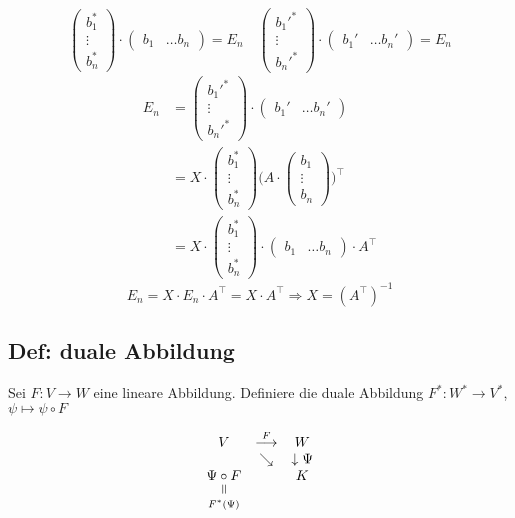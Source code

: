 \documentclass[titlepage,12pt,a4paper,ngerman]{report}
\newcommand{\verteq}{\rotatebox{90}{$\,=$}}
\newcommand{\equalto}[2]{\underset{\scriptstyle\overset{\mkern4mu\verteq}{#2}}{#1}}
\begin{document}
{$$\begin{pmatrix}
b_1^*\\
\vdots\\
b_n^*
\end{pmatrix} \cdot \begin{pmatrix}
b_1 & \dots b_n
\end{pmatrix} = E_n \quad \begin{pmatrix}
b_1'^*\\
\vdots\\
b_n'^*
\end{pmatrix} \cdot \begin{pmatrix}
b_1' & \dots b_n'
\end{pmatrix} = E_n $$
\begin{align*}
E_n &= \begin{pmatrix}
b_1'^*\\
\vdots\\
b_n'^*
\end{pmatrix} \cdot \begin{pmatrix}
b_1' & \dots b_n'
\end{pmatrix}\\
&= X \cdot \begin{pmatrix}
b_1^*\\
\vdots\\
b_n^*
\end{pmatrix} \bigg( A \cdot \begin{pmatrix}
b_1\\
\vdots\\
b_n
\end{pmatrix} \bigg) ^\top\\
&= X \cdot \begin{pmatrix}
b_1^*\\
\vdots\\
b_n^*
\end{pmatrix} \cdot \begin{pmatrix}
b_1 & \dots b_n
\end{pmatrix} \cdot A^\top
\end{align*}
$$E_n = X \cdot E_n \cdot A^\top = X \cdot A^\top \Rightarrow X = (A^\top)^{-1}$$
}

\subsection{Def: duale Abbildung}
Sei $F: V \to W$ eine lineare Abbildung. Definiere die duale Abbildung $F^* : W^* \to V^*$, $\psi \mapsto \psi \circ F$


$$\begin{array}{ccc}
V & \buildrel F \over \longrightarrow & W \\
& \searrow & \downarrow \Psi \\
\equalto{\Psi \circ F }{F^*(\Psi)} & & K
\end{array}$$
\end{document}
